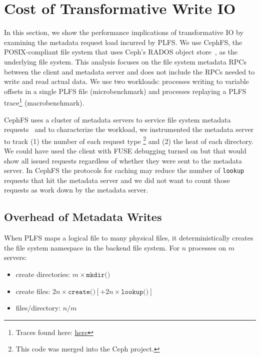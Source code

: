 \section{Cost of Transformative Write IO}

In this section, we show the performance implications of transformative IO by
examining the metadata request load incurred by PLFS. We use CephFS, the
POSIX-compliant file system that uses Ceph's RADOS object
store~\cite{weil:osdi2006-ceph}, as the underlying file system.  This analysis
focuses on the file system metadata RPCs between the client and metadata server
and does not include the RPCs needed to write and read actual data.  We use two
workloads: processes writing to variable offsets in a single PLFS file
(microbenchmark) and processes replaying a PLFS trace\footnote{Traces found
here:
\href{https://web.archive.org/web/20140419194914/http://institutes.lanl.gov/plfs/maps/}{here}}
(macrobenchmark). 

CephFS uses a cluster of metadata servers to service file system metadata
requests~\cite{weil:sc2004-dyn-metadata} and to characterize the workload, we
instrumented the metadata server to track (1) the number of each request type
\footnote{This code was merged into the Ceph project.} and (2) the heat of each
directory.  We could have used the client with FUSE debugging turned on but
that would show all issued requests regardless of whether they were sent to the
metadata server. In CephFS the protocols for caching may reduce the number of
\texttt{lookup} requests that hit the metadata server and we did not want to
count those requests as work down by the metadata server.


\subsection{Overhead of Metadata Writes}
When PLFS maps a logical file to many physical files, it deterministically
creates the file system namespace in the backend file system.  For \(n\)
processes on \(m\) servers:

\begin{itemize}
  \item create directories: \(m \times \texttt{mkdir()}\)
  \item create files: \(2n \times \texttt{create()} [+ 2n \times \texttt{lookup()}]\)
  \item files/directory: \(n/m\)
\end{itemize}


